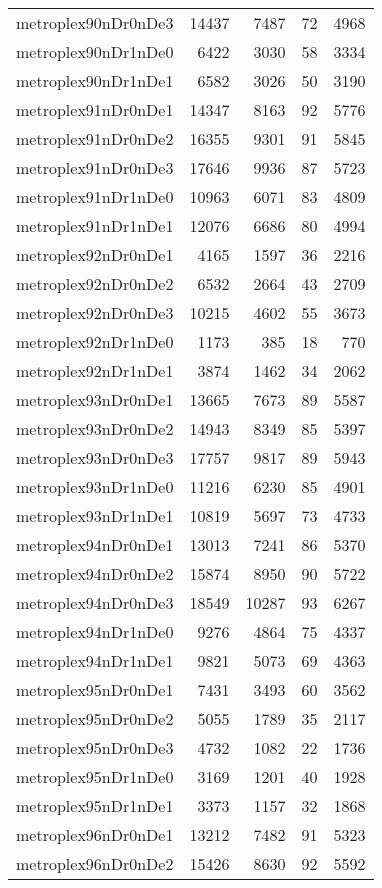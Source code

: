 \begin{longtable}{lrrrr}
metroplex90nDr0nDe3 & 14437 & 7487 & 72 & 4968 \\
metroplex90nDr1nDe0 & 6422 & 3030 & 58 & 3334 \\
metroplex90nDr1nDe1 & 6582 & 3026 & 50 & 3190 \\
metroplex91nDr0nDe1 & 14347 & 8163 & 92 & 5776 \\
metroplex91nDr0nDe2 & 16355 & 9301 & 91 & 5845 \\
metroplex91nDr0nDe3 & 17646 & 9936 & 87 & 5723 \\
metroplex91nDr1nDe0 & 10963 & 6071 & 83 & 4809 \\
metroplex91nDr1nDe1 & 12076 & 6686 & 80 & 4994 \\
metroplex92nDr0nDe1 & 4165 & 1597 & 36 & 2216 \\
metroplex92nDr0nDe2 & 6532 & 2664 & 43 & 2709 \\
metroplex92nDr0nDe3 & 10215 & 4602 & 55 & 3673 \\
metroplex92nDr1nDe0 & 1173 & 385 & 18 & 770 \\
metroplex92nDr1nDe1 & 3874 & 1462 & 34 & 2062 \\
metroplex93nDr0nDe1 & 13665 & 7673 & 89 & 5587 \\
metroplex93nDr0nDe2 & 14943 & 8349 & 85 & 5397 \\
metroplex93nDr0nDe3 & 17757 & 9817 & 89 & 5943 \\
metroplex93nDr1nDe0 & 11216 & 6230 & 85 & 4901 \\
metroplex93nDr1nDe1 & 10819 & 5697 & 73 & 4733 \\
metroplex94nDr0nDe1 & 13013 & 7241 & 86 & 5370 \\
metroplex94nDr0nDe2 & 15874 & 8950 & 90 & 5722 \\
metroplex94nDr0nDe3 & 18549 & 10287 & 93 & 6267 \\
metroplex94nDr1nDe0 & 9276 & 4864 & 75 & 4337 \\
metroplex94nDr1nDe1 & 9821 & 5073 & 69 & 4363 \\
metroplex95nDr0nDe1 & 7431 & 3493 & 60 & 3562 \\
metroplex95nDr0nDe2 & 5055 & 1789 & 35 & 2117 \\
metroplex95nDr0nDe3 & 4732 & 1082 & 22 & 1736 \\
metroplex95nDr1nDe0 & 3169 & 1201 & 40 & 1928 \\
metroplex95nDr1nDe1 & 3373 & 1157 & 32 & 1868 \\
metroplex96nDr0nDe1 & 13212 & 7482 & 91 & 5323 \\
metroplex96nDr0nDe2 & 15426 & 8630 & 92 & 5592 \\

\end{longtable}
